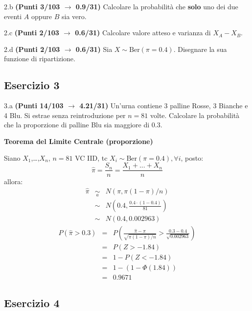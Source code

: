 \documentclass[
  11pt,
]{book}
\theoremstyle{mytheoremstyle}
\theoremstyle{mydefstyle}
\newenvironment{sol}
  {
  \begin{tcolorbox}[enhanced,breakable,arc=0.1mm,boxrule=1pt,colback=white,colframe=iblue,
  title=\bf \fontfamily{lmss}\selectfont \hspace{.5 cm} Soluzione,drop fuzzy shadow]

}{
\end{tcolorbox}
  }
\begin{document}
2.b \textbf{(Punti 3/103 \(\rightarrow\) 0.9/31)} Calcolare la probabilità che \textbf{solo} uno dei due eventi \(A\) oppure \(B\) sia vero.

2.c \textbf{(Punti 2/103 \(\rightarrow\) 0.6/31)} Calcolare valore atteso e varianza di \(X_A-X_B\).

2.d \textbf{(Punti 2/103 \(\rightarrow\) 0.6/31)} Sia \(X\sim\text{Ber}(\pi=0.4)\). Disegnare la sua funzione di ripartizione.

\subsection{Esercizio 3}\label{esercizio-3-25}

3.a \textbf{(Punti 14/103 \(\rightarrow\) 4.21/31)} Un'urna contiene 3 palline Rosse, 3 Bianche e 4 Blu. Si estrae senza reintroduzione per \(n=81\) volte.
Calcolare la probabilità che la proporzione di palline Blu sia maggiore di 0.3.

\begin{sol}
\textbf{Teorema del Limite Centrale (proporzione)}

Siano \(X_1\),\ldots,\(X_n\), \(n=81\) VC IID, tc \(X_i\sim\text{Ber}(\pi=0.4)\)\(,\forall i\), posto:
\[
      \hat\pi=\frac{S_n}n = \frac{X_1 + ... + X_n}n
      \]
allora:\begin{eqnarray*}
  \hat\pi & \mathop{\sim}\limits_{a}& N(\pi,\pi(1-\pi)/n) \\
  &\sim & N\left(0.4,\frac{0.4\cdot(1-0.4)}{81}\right) \\
     &\sim & N(0.4,0.002963) 
  \end{eqnarray*}\begin{eqnarray*}
      P( \hat\pi   >   0.3 ) 
        &=& P\left(  \frac { \hat\pi  -  \pi }{ \sqrt{\pi(1-\pi)/n} }  >  \frac { 0.3  -  0.4 }{\sqrt{ 0.002963 }} \right)  \\
                 &=& P\left(  Z   >   -1.84 \right) \\    &=& 1-P(Z< -1.84 )\\ 
                 &=&  1-(1-\Phi( 1.84 )) \\ &=&  0.9671 
      \end{eqnarray*}

\end{sol}

\subsection{Esercizio 4}\label{esercizio-4-25}
\end{document}
